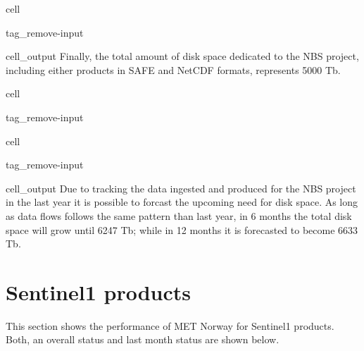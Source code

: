 \documentclass[letterpaper,10pt,english]{jupyterBook}
\begin{document}
\begin{sphinxuseclass}{cell}
\begin{sphinxuseclass}{tag_remove-input}\begin{sphinxVerbatimOutput}

\begin{sphinxuseclass}{cell_output}
\sphinxAtStartPar
Finally, the total amount of disk space dedicated to the NBS project, including either products in SAFE and NetCDF formats, represents 5000 Tb.

\end{sphinxuseclass}\end{sphinxVerbatimOutput}

\end{sphinxuseclass}
\end{sphinxuseclass}
\begin{sphinxuseclass}{cell}
\begin{sphinxuseclass}{tag_remove-input}
\end{sphinxuseclass}
\end{sphinxuseclass}
\begin{sphinxuseclass}{cell}
\begin{sphinxuseclass}{tag_remove-input}\begin{sphinxVerbatimOutput}

\begin{sphinxuseclass}{cell_output}
\sphinxAtStartPar
Due to tracking the data ingested and produced for the NBS project in the last year it is possible to forcast the upcoming need for disk space. As long as data flows follows the same pattern than last year, in 6 months the total disk space will grow until 6247 Tb; while in 12 months it is forecasted to become 6633 Tb.

\end{sphinxuseclass}\end{sphinxVerbatimOutput}

\end{sphinxuseclass}
\end{sphinxuseclass}
\sphinxstepscope


\chapter{Sentinel\sphinxhyphen{}1 products}
\label{\detokenize{S1_portals:sentinel-1-products}}\label{\detokenize{S1_portals::doc}}
\sphinxAtStartPar
This section shows the performance of MET Norway for Sentinel\sphinxhyphen{}1 products. Both, an overall status and last month status are shown below.
\end{document}

